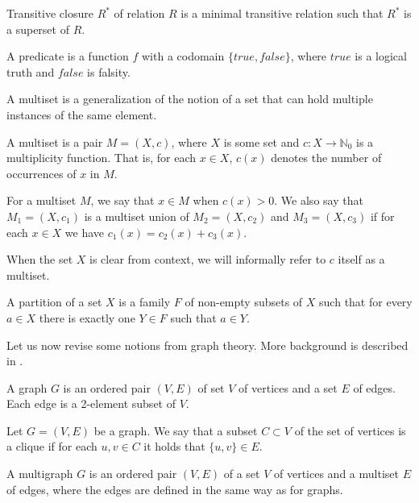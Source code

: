 \begin{defn}
Transitive closure $R^*$ of relation $R$ is a minimal transitive relation 
such that $R^*$ is a superset of $R$.
\end{defn}

\begin{defn}[predicate]
A predicate is a function $f$ with a codomain $\{true, false\}$,
where $true$ is a logical truth and $false$ is falsity.
\end{defn}

A multiset is a generalization of the notion of a set that can hold multiple instances of the same element.

\begin{defn}[multiset]
A multiset is a pair $M = (X, c)$, where $X$ is some set and $c:X \rightarrow \mathbb{N}_0$
is a multiplicity function.
That is, for each $x \in X$, $c(x)$ denotes the number of occurrences of $x$ in $M$.
\end{defn}

For a multiset $M$, we say that $x \in M$ when $c(x) > 0$.
We also say that $M_1 = (X, c_1)$ is a multiset union of $M_2 = (X, c_2)$ and $M_3 = (X, c_3)$
if for each $x \in X$ we have $c_1(x) = c_2(x) + c_3(x)$.

When the set $X$ is clear from context, we will informally refer to $c$ itself as a multiset.

\begin{defn}
A partition of a set $X$ is a family $F$ of non-empty subsets of $X$
such that for every $a \in X$ there is exactly one $Y \in F$ such that $a \in Y$.
\end{defn}

Let us now revise some notions from graph theory.
More background is described in \cite{graphtheory}.

\begin{defn}[graph]
A graph $G$ is an ordered pair $(V,E)$ of set $V$ of vertices and a set $E$ of edges.
Each edge is a 2-element subset of $V$.
\end{defn}

\begin{defn}[clique]
Let $G=(V,E)$ be a graph.
We say that a subset $C \subset V$ of the set of vertices is a clique if
for each $u,v \in C$ it holds that $\{u,v\} \in E$.
\end{defn}

\begin{defn}[multigraph]
A multigraph $G$ is an ordered pair $(V,E)$ of a set $V$ of vertices and a multiset $E$ of edges,
where the edges are defined in the same way as for graphs.
\end{defn}

